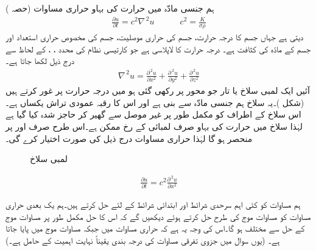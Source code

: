 ہم جنسی مادّہ میں حرارت کی بہاو حراری مساوات (حصہ )
\begin{align*}
\frac{\partial u}{\partial t}=c^2\nabla^{\,2}u\quad \quad \quad c^2=\frac{K}{\sigma \rho}
\end{align*}
دیتی ہے جہاں  جسم کا درجہ حرارت،  جسم کی  حراری موصلیت،  جسم کی مخصوص حراری استعداد اور  جسم کے مادّہ کی کثافت ہے۔  درجہ حرارت  کا لاپلاسی ہے جو کارتیسی نظام کی محدد ، ،  کے لحاظ سے درج ذیل لکھا جاتا ہے۔
\begin{align*}
\nabla^{\,2}u=\frac{\partial^{\,2}u}{\partial x^2}+\frac{\partial^{\,2}u}{\partial y^2}+\frac{\partial^{\,2} u}{\partial z^2}
\end{align*}
آئیں ایک لمبی سلاخ یا تار جو  محور پر رکھی گئی ہو میں درجہ حرارت پر غور کرتے ہیں (شکل )۔یہ سلاخ ہم جنسی مادّہ سے بنی ہے اور اس کا رقبہ عمودی تراش  یکساں ہے۔اس سلاخ کے اطراف کو مکمل طور پر غیر موصل سے گھیر کر حاجز شدہ کیا گیا ہے لہٰذا سلاخ میں حرارت کی بہاو صرف لمبائی کے رخ ممکن ہے۔اس طرح  صرف  اور  پر منحصر ہو گا لہٰذا حراری مساوات درج ذیل  کی صورت اختیار کرے گی۔
\begin{figure}
\centering
{}
\caption{لمبی سلاخ}
\label{شکل_جزوی_لمبی_سلاخ}
\end{figure}
%
\begin{align}\label{مساوات_جزوی_حراری_الف}
\frac{\partial u}{\partial t}=c^2\frac{\partial^{\,2}u}{\partial x^2}
\end{align}

ہم مساوات  کو کئی اہم سرحدی شرائط اور ابتدائی شرائط کے لئے حل کرتے ہیں۔ہم یک بعدی حراری مساوات کو  مساوات موج کی طرح حل کرتے ہوئے دیکھیں گے کہ اس کا حل مکمل طور پر مساوات موج کے حل سے مختلف ہو گا۔اس کی وجہ یہ ہے کہ حراری مساوات میں  جبکہ مساوات موج میں  پایا جاتا ہے۔ (یوں سوال  میں جزوی تفرقی مساوات کی درجہ بندی یقیناً نہایت اہمیت کے حامل ہے۔)

